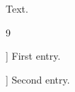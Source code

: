 \documentclass{article}
\makeatletter
\def\composelist{\addtocounter{\@listctr}{1}\the\value{\@listctr}}
\def\@wrap@list#1{[#1]}
\def\bibritem#1{\item[\@wrap@list{\composelist}]\ignorespaces}
\makeatother
\begin{document}
Text.
\begin{thebibliography}{9}
\bibritem{a} First entry.
\bibritem{b} Second entry.
\end{thebibliography}
\end{document}
